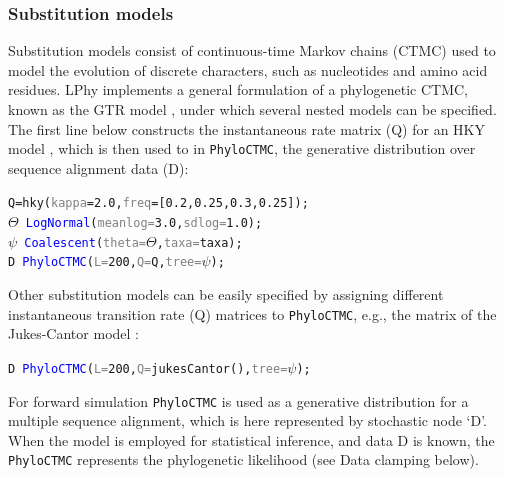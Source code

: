 \documentclass[10pt,letterpaper,table]{article}
\begin{document}
\subsubsection{Substitution models}
Substitution models consist of continuous-time Markov chains (CTMC) used to model the evolution of discrete characters, such as nucleotides and amino acid residues. 
LPhy implements a general formulation of a phylogenetic CTMC, known as the GTR model \cite{gtr}, under which several nested models can be specified. 
The first line below constructs the instantaneous rate matrix (Q) for an HKY model \cite{hasegawa1985dating}, which is then used to in \texttt{PhyloCTMC}, the generative distribution over sequence alignment data (D):

{
  \small
  \begin{listing}
    \begin{alltt}
    Q = \textcolor{generator}{hky}(\textcolor{gray}{kappa}=\textcolor{constant}{2.0}, \textcolor{gray}{freq}=[\textcolor{constant}{0.2}, \textcolor{constant}{0.25}, \textcolor{constant}{0.3}, \textcolor{constant}{0.25}]);
    \textcolor{bluishgreen}{\(\Theta\)} ~ \textcolor{blue}{LogNormal}(\textcolor{gray}{meanlog=}\textcolor{constant}{3.0}, \textcolor{gray}{sdlog=}\textcolor{constant}{1.0});
    \textcolor{bluishgreen}{\(\psi\)} ~ \textcolor{blue}{Coalescent}(\textcolor{gray}{theta=}\textcolor{bluishgreen}{\(\Theta\)}, \textcolor{gray}{taxa=}taxa);
    \textcolor{bluishgreen}{D} ~ \textcolor{blue}{PhyloCTMC}(\textcolor{gray}{L=}\textcolor{constant}{200}, \textcolor{gray}{Q=}Q, \textcolor{gray}{tree=}\textcolor{bluishgreen}{\(\psi\)});
    \end{alltt}
  \end{listing}
}

Other substitution models can be easily specified by assigning different instantaneous transition rate (Q) matrices to \texttt{PhyloCTMC}, e.g., the matrix of the Jukes-Cantor model \cite{jc69}:
{
  \small
  \begin{listing}
    \begin{alltt}
    \textcolor{bluishgreen}{D} ~ \textcolor{blue}{PhyloCTMC}(\textcolor{gray}{L=}\textcolor{constant}{200}, \textcolor{gray}{Q=}\textcolor{generator}{jukesCantor}(), \textcolor{gray}{tree=}\textcolor{bluishgreen}{\(\psi\)});
    \end{alltt}
  \end{listing}
}

For forward simulation \texttt{PhyloCTMC} is used as a generative distribution for a multiple sequence alignment, which is here represented by stochastic node `D'. When the model is employed for statistical inference, and data D is known, the \texttt{PhyloCTMC} represents the phylogenetic likelihood (see Data clamping below).
\end{document}
